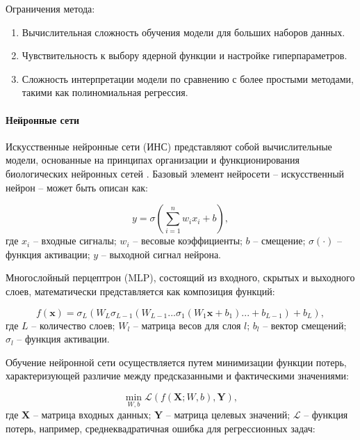 Ограничения метода:

\begin{enumerate}
	\item Вычислительная сложность обучения модели для больших наборов данных.
	\item Чувствительность к выбору ядерной функции и настройке гиперпараметров.
	\item Сложность интерпретации модели по сравнению с более простыми методами, такими как полиномиальная регрессия.
\end{enumerate}

\paragraph{Нейронные сети}

Искусственные нейронные сети (ИНС) представляют собой вычислительные модели, основанные на
принципах организации и функционирования биологических нейронных сетей
\cite{goodfellow2016deep}. Базовый элемент нейросети -- искусственный нейрон -- может быть описан как:

\begin{equation}
    y = \sigma \left( \sum_{i=1}^{n} w_i x_i + b \right),
\end{equation}
где $x_i$ -- входные сигналы;
$w_i$ -- весовые коэффициенты;
$b$ -- смещение;
$\sigma(\cdot)$ -- функция активации;
$y$ -- выходной сигнал нейрона.

Многослойный перцептрон (MLP), состоящий из входного, скрытых
и выходного слоев, математически представляется как композиция функций:

\begin{equation}
    f(\mathbf{x}) = \sigma_L(W_L\sigma_{L-1}(W_{L-1}...\sigma_1(W_1 \mathbf{x} + b_1)... + b_{L-1}) + b_L),
\end{equation}
где $L$ -- количество слоев;
$W_l$ -- матрица весов для слоя $l$;
$b_l$ -- вектор смещений;
$\sigma_l$ -- функция активации.

Обучение нейронной сети осуществляется путем минимизации функции
потерь, характеризующей различие между предсказанными и фактическими значениями:

\begin{equation}
    \min_{W, b} \mathcal{L}(f(\mathbf{X}; W, b), \mathbf{Y}),
\end{equation}
где $\mathbf{X}$ -- матрица входных данных;
$\mathbf{Y}$ -- матрица целевых значений;
$\mathcal{L}$ -- функция потерь, например, среднеквадратичная ошибка для регрессионных задач:

